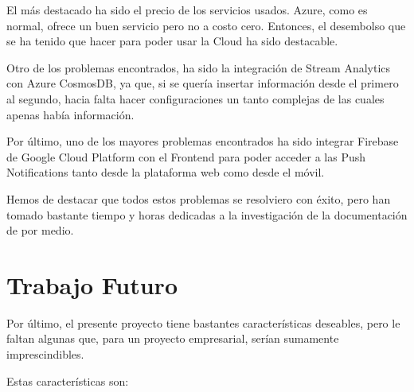 El más destacado ha sido el precio de los servicios usados. Azure, como es normal, ofrece un buen servicio pero no a costo cero. Entonces, el desembolso que se ha tenido que hacer para poder usar la Cloud ha sido destacable.

Otro de los problemas encontrados, ha sido la integración de Stream Analytics con Azure CosmosDB, ya que, si se quería insertar información desde el primero al segundo, hacia falta hacer configuraciones un tanto complejas de las cuales apenas había información.

Por último, uno de los mayores problemas encontrados ha sido integrar Firebase de Google Cloud Platform con el Frontend para poder acceder a las Push Notifications tanto desde la plataforma web como desde el móvil.

Hemos de destacar que todos estos problemas se resolviero con éxito, pero han tomado bastante tiempo y horas dedicadas a la investigación de la documentación de por medio.

\section{Trabajo Futuro}
Por último, el presente proyecto tiene bastantes características deseables, pero le faltan algunas que, para un proyecto empresarial, serían sumamente imprescindibles.

Estas características son:

